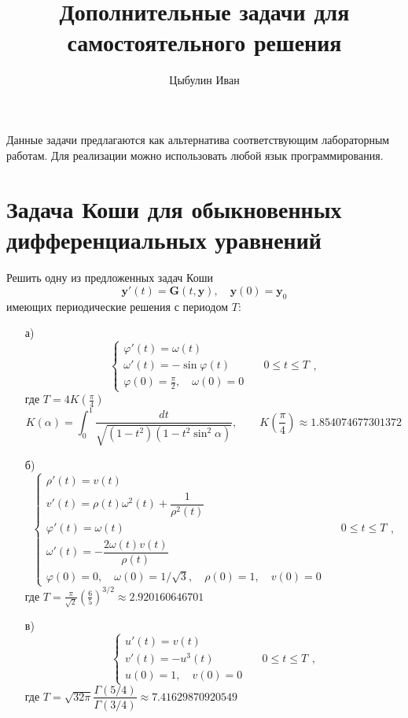 \documentclass[10pt]{article}
\title{Дополнительные задачи для самостоятельного решения}
\author{Цыбулин Иван}
\begin{document}
\maketitle

Данные задачи предлагаются как альтернатива соответствующим лабораторным
работам. Для реализации можно использовать любой язык программирования.

\section{Задача Коши для обыкновенных дифференциальных уравнений}
Решить одну из предложенных задач Коши
\[
\mathbf{y}'(t) = \mathbf{G}(t, \mathbf{y}), \quad \mathbf{y}(0) = \mathbf{y}_0
\]
имеющих периодические решения с периодом $T$:
\begin{enumerate}
\item[а)]
\begin{equation*}
\begin{cases}
\varphi'(t) = \omega(t)\\
\omega'(t) = -\sin \varphi(t) &\quad
0 \leq t \leq T\\
\varphi(0) = \frac{\pi}{2}, \quad \omega(0) = 0
\end{cases},
\end{equation*}
где $T = 4 K\left(\frac{\pi}{4}\right)$
\[
K(\alpha) = \int_0^1 \frac{dt}{\sqrt{(1-t^2)(1-t^2 \sin^2 \alpha)}}, \qquad
K\left(\frac{\pi}{4}\right) \approx 1.854074677301372
\]
\item[б)]
\begin{equation*}
\begin{cases}
\rho'(t) = v(t)\\
v'(t) = \rho(t)\omega^2(t) + \dfrac{1}{\rho^2(t)}\\
\varphi'(t) = \omega(t) &\quad 0 \leq t \leq T\\
\omega'(t) = -\dfrac{2\omega(t)v(t)}{\rho(t)}\\ 
\varphi(0) = 0, \quad \omega(0) = 1 / \sqrt{3},
\quad \rho(0) = 1, \quad v(0) = 0
\end{cases},
\end{equation*}
где $T = \frac{\pi}{\sqrt{2}} \left(\frac{6}{5}\right)^{3/2} \approx 2.920160646701$
\item[в)]
\begin{equation*}
\begin{cases}
u'(t) = v(t)\\
v'(t) = -u^3(t) &\quad
0 \leq t \leq T\\
u(0) = 1, \quad v(0) = 0
\end{cases},
\end{equation*}
где $T = \sqrt{32\pi} \dfrac{\Gamma(5/4)}{\Gamma(3/4)} \approx 7.41629870920549$
\end{enumerate}
\end{document}
